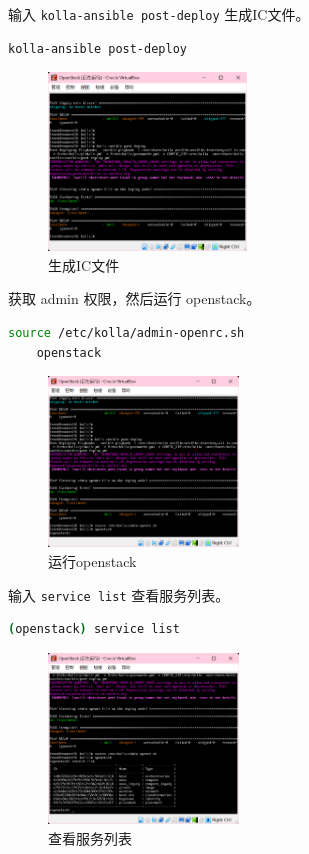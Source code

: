 \documentclass{article}
\begin{document}
输入 \texttt{kolla-ansible post-deploy} 生成IC文件。

\begin{lstlisting}[language=bash]
    kolla-ansible post-deploy
\end{lstlisting}

\begin{figure}[H]
    \centering
    \includegraphics[width=0.47\textwidth]{img/7.4.png}
    \caption{生成IC文件}
\end{figure}

获取 admin 权限，然后运行 openstack。

\begin{lstlisting}[language=bash]
    source /etc/kolla/admin-openrc.sh
    openstack
\end{lstlisting}

\begin{figure}[H]
    \centering
    \includegraphics[width=0.45\textwidth]{img/7.5.png}
    \caption{运行openstack}
\end{figure}

输入 \texttt{service list} 查看服务列表。

\begin{lstlisting}[language=bash]
    (openstack) service list
\end{lstlisting}

\begin{figure}[H]
    \centering
    \includegraphics[width=0.45\textwidth]{img/7.6.png}
    \caption{查看服务列表}
\end{figure}
\end{document}
